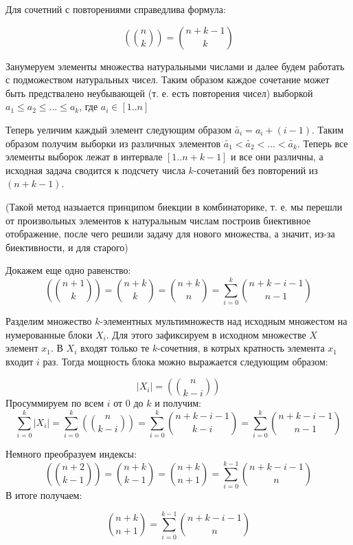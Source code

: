 Для сочетний с повторениями справедлива формула:

\begin{equation}
	\left( \binom{n}{k} \right) = \binom{n+k-1}{k}
\end{equation}

\begin{Proof}
	Занумеруем элементы множества натуральными числами и далее будем работать с подможеством натуральных чисел. Таким образом каждое сочетание может быть предствалено неубывающей (т. е. есть повторения чисел) выборкой $a_1 \le a_2 \le ... \le a_k$, где $a_i \in \left[ 1 .. n \right]$

	Теперь уеличим каждый элемент следующим образом $\tilde {a_i} = a_i + (i - 1)$. Таким образом получим выборки из различных элементов $\tilde {a_1} < \tilde {a_2} < ... < \tilde {a_k} $. Теперь все элементы выборок лежат в интервале $\left[ 1 .. n+k-1 \right]$ и все они различны, а исходная задача сводится к подсчету числа $k$-сочетаний без повторений из $(n+k-1)$.

	(Такой метод назыается принципом биекции в комбинаторике, т. е. мы перешли от произвольных элементов к натуральным числам построив биективное отображение, после чего решили задачу для нового множества, а значит, из-за биективности, и для старого)	
\end{Proof}

Докажем еще одно равенство:
	\[
		\left( \binom{n+1}{k} \right) = \binom{n+k}{k} = \binom{n+k}{n} = \sum_{i=0}^k \binom{n+k-i-1}{n-1}	
	\]

\begin{Proof}
	Разделим множество $k$-элементных мультимножеств над исходным множестом на нумерованные блоки $X_i$. Для этого зафиксируем в исходном множестве $X$ элемент $x_1$. В $X_i$ входят только те $k$-сочетния, в котрых кратность элемента $x_1$ входит $i$ раз. Тогда мощность блока можно выражается следующим образом:

	\[
		\left| X_i \right| = \left( \binom{n}{k-i} \right)
	\]
	Просуммируем по всем $i$ от $0$ до $k$ и получим:
	\[
		\sum_{i=0}^k\left| X_i \right| = \sum_{i=0}^k \left( \binom{n}{k-i} \right) = \sum_{i=0}^k \binom{n+k-i-1}{k-i} =\sum_{i=0}^k \binom{n+k-i-1}{n-1}
	\]
\end{Proof}

Немного преобразуем индексы:
	\[
		\left( \binom{n+2}{k-1} \right) = \binom{n+k}{k-1} = \binom{n+k}{n+1} = \sum_{i=0}^{k-1} \binom{n+k-i-1}{n}
	\]
В итоге получаем:

\begin{equation}
	\binom{n+k}{n+1} = \sum_{i=0}^{k-1} \binom{n+k-i-1}{n}
\end{equation}

